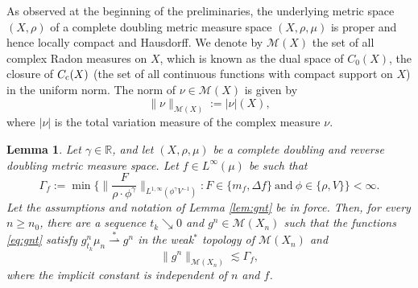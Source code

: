 \documentclass[11pt]{amsart}
\newtheorem{lemma}[theorem]{Lemma}
\theoremstyle{definition}
\theoremstyle{remark}
\numberwithin{equation}{section}
\newcommand{\abs}[1]{|#1|}
\newcommand{\Norm}[2]{\|#1\|_{#2}}
\begin{document}
As observed at the beginning of the preliminaries,
the underlying metric space $(X,\rho)$ of a
complete doubling metric measure space $(X,\rho,\mu)$ is proper and hence
locally compact and Hausdorff.
We denote by $\mathscr{M}(X)$
the set of all complex Radon measures on $X$, which is known as the dual space of
$C_0(X)$, the closure of $C_{\rm c}(X)$
(the set of all continuous functions with compact support on $X$) in the uniform norm. The
norm of $\nu\in\mathscr M(X)$ is given by
\begin{equation*}
  \Norm{\nu}{\mathscr M(X)}:=\abs{\nu}(X),
\end{equation*}
where $\abs{\nu}$ is the total variation measure of the complex measure $\nu$.

\begin{lemma}\label{lem:weakL1>liminf}
Let $\gamma\in\mathbb R$, and let $(X,\rho,\mu)$ be a complete doubling
and reverse doubling metric measure space. Let $f\in L^\infty(\mu)$ be such that
\begin{equation}\label{eq:Gammaf}
  \Gamma_f:=\min\bigg\{\Big\|\frac{F}{\rho
  \cdot\phi^\gamma}\Big\|_{L^{1,\infty}(\phi^{\gamma}V^{-1})}:
  F\in\{m_f,\Delta f\}\ \text{and}\ \phi\in\{\rho,V\}\bigg\}<\infty.
\end{equation}
Let the assumptions and notation of Lemma \ref{lem:gnt} be in force.
Then, for every $n\geq n_0$, there are a sequence $t_k\searrow 0$ and $g^n\in
\mathscr{M}(X_n)$
such that the functions \eqref{eq:gnt} satisfy
$g^n_{t_k}\mu_n\overset{*}{\rightharpoonup} g^n$ in the weak$^*$ topology of
$\mathscr{M}(X_n)$
and
\begin{equation*}
  \Norm{g^n}{\mathscr{M}(X_n)}\lesssim\Gamma_f,
\end{equation*}
where the implicit constant is independent of $n$ and $f$.
\end{lemma}
\end{document}
